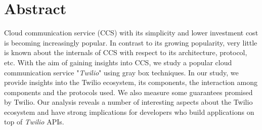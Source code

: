 \section{Abstract}
\label{sec-abstract}
Cloud communication service (CCS) with its simplicity and lower investment cost is becoming increasingly popular. In contrast to its growing popularity, very little is known about the internals of CCS with respect to its architecture, protocol, etc. With the aim of gaining insights into CCS, we study 
a popular cloud communication service "\textit{Twilio}" using gray box techniques. 
In our study, we  provide insights into the Twilio ecosystem, its components, the interaction among components and the protocols used.
We also measure some guarantees 
promised by Twilio. Our analysis reveals a number of interesting aspects about the Twilio ecosystem and have strong implications for developers who build applications on top of \textit{Twilio} APIs.
